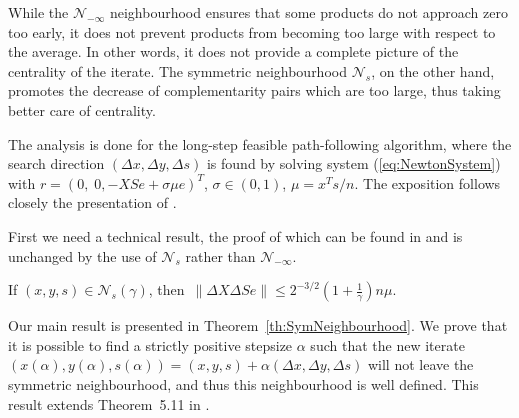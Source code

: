 While the $\mathcal{N}_{-\infty}$ neighbourhood ensures that some 
products do not approach zero too early, it does not prevent products
from becoming too large with respect to the average.
In other words, it does not provide a complete 
picture of the centrality of the iterate. The symmetric 
neighbourhood $\mathcal{N}_s$, on the other hand, promotes 
the decrease of complementarity pairs which are too large, thus taking 
better care of centrality.


The analysis is done for the long-step feasible path-following 
algorithm, where the search direction $(\Delta x, \Delta y, \Delta s)$ 
is found by solving system (\ref{eq:NewtonSystem}) with 
$r=(0,\; 0,-XSe+\sigma\mu e)^T$, $\sigma\in(0,1)$, $\mu=x^Ts/n$.
%
The exposition follows closely the presentation of 
\cite[Chapter~5]{ipm:Wright97}. 

First we need a technical result, the proof of which can be found 
in \cite[Lemma~5.10]{ipm:Wright97} and is unchanged by the use 
of $\mathcal{N}_s$ rather than $\mathcal{N}_{-\infty}$.
%
\begin{lemma} \label{Wright:5.10}
If $(x,y,s)\in \mathcal{N}_s(\gamma)$, then\,
\(
  \|\Delta X\Delta Se\| \le 2^{-3/2}\left( 1+ \displaystyle{\frac{1}{\gamma}} \right)n\mu.
\)
\end{lemma}

Our main result is presented in Theorem~\ref{th:SymNeighbourhood}. 
We prove that it is possible to find a strictly positive stepsize 
$\alpha$ such that the new iterate 
$(x(\alpha),y(\alpha),s(\alpha))=(x,y,s)+\alpha(\Delta x,\Delta y,\Delta s)$
will not leave the symmetric neighbourhood, and thus this 
neighbourhood is well defined. This result extends 
Theorem~5.11 in \cite{ipm:Wright97}.

